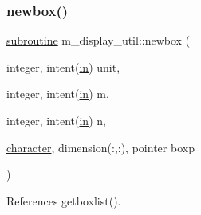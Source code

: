 \subsubsection{\texorpdfstring{newbox()}{newbox()}}
{\footnotesize\ttfamily \hyperlink{M__stopwatch_83_8txt_acfbcff50169d691ff02d4a123ed70482}{subroutine} m\+\_\+display\+\_\+util\+::newbox (\begin{DoxyParamCaption}\item[{integer, intent(\hyperlink{M__journal_83_8txt_afce72651d1eed785a2132bee863b2f38}{in})}]{unit,  }\item[{integer, intent(\hyperlink{M__journal_83_8txt_afce72651d1eed785a2132bee863b2f38}{in})}]{m,  }\item[{integer, intent(\hyperlink{M__journal_83_8txt_afce72651d1eed785a2132bee863b2f38}{in})}]{n,  }\item[{\hyperlink{option__stopwatch_83_8txt_abd4b21fbbd175834027b5224bfe97e66}{character}, dimension(\+:,\+:), pointer}]{boxp }\end{DoxyParamCaption})\hspace{0.3cm}{\ttfamily [private]}}



References getboxlist().

